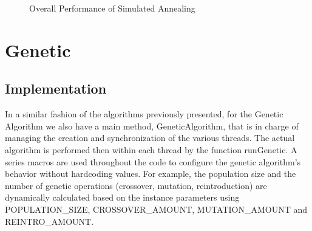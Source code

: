 \begin{figure}[H]
	\centering
	\caption{Overall Performance of Simulated Annealing}
    \label{fig:annealingCost}
\end{figure}

\section{Genetic}
\subsection{Implementation}
In a similar fashion of the algorithms previously presented, for the Genetic Algorithm we also have a main method, GeneticAlgorithm, that is in 
charge of managing the creation and synchronization of the various threads. The actual algorithm is performed then within each thread by the function runGenetic.
A series macros are used throughout the code to configure the genetic algorithm's behavior without hardcoding values. For example, the population 
size and the number of genetic operations (crossover, mutation, reintroduction) are dynamically calculated based on the instance parameters using 
POPULATION\_SIZE, CROSSOVER\_AMOUNT, MUTATION\_AMOUNT and REINTRO\_AMOUNT. 

